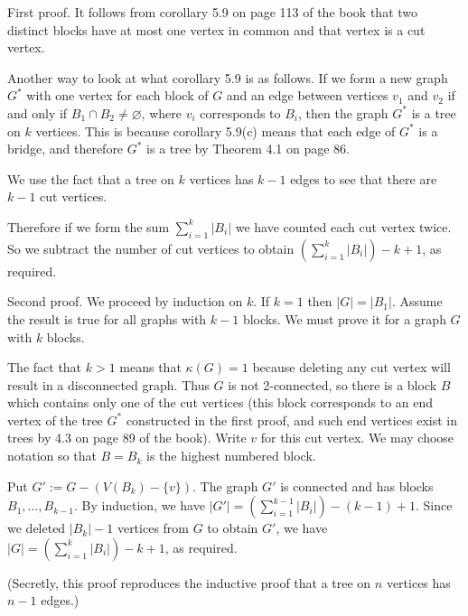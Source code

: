 \documentclass[10pt,reqno]{amsart}
\begin{document}
\begin{outline}[enumerate]
First proof. It follows from corollary 5.9 on page 113 of the book that two
distinct blocks have at most one vertex in common and that vertex is a cut
vertex.

Another way to look at what corollary 5.9 is as follows. If we form a new graph
$G^*$ with one vertex for each block of $G$ and an edge between vertices $v_1$
and $v_2$ if and only if $B_1\cap B_2\neq\varnothing$, where $v_i$ corresponds
to $B_i$, then the graph $G^*$ is a tree on $k$ vertices. This is because
corollary 5.9(c) means that each edge of $G^*$ is a bridge, and therefore $G^*$
is a tree by Theorem 4.1 on page 86.

We use the fact that a tree on $k$ vertices has $k-1$ edges to see that there
are $k-1$ cut vertices.

Therefore if we form the sum \(\sum_{i=1}^k |B_i| \) we have counted each cut
vertex twice. So we subtract the number of cut vertices to obtain \( (
\sum_{i=1}^k |B_i| )- k + 1\), as required.

Second proof. We proceed by induction on $k$. If $k=1$ then $|G| = |B_1|$.
Assume the result is true for all graphs with $k-1$ blocks. We must prove it
for a graph $G$ with $k$ blocks.

The fact that $k > 1$ means that $\kappa(G) = 1$ because deleting any cut
vertex will result in a disconnected graph. Thus $G$ is not 2-connected, so
there is a block $B$ which contains only one of the cut vertices (this block
corresponds to an end vertex of the tree $G^*$ constructed in the first proof,
and such end vertices exist in trees by 4.3 on page 89 of the book). Write $v$
for this cut vertex. We may choose notation so that $B = B_k$ is the highest
numbered block.

Put $G' := G - (V(B_k) - \{v\})$. The graph $G'$ is connected and has blocks
$B_1,\dots,B_{k-1}.$ By induction, we have $|G'| =
(\sum_{i=1}^{k-1}|B_i|)-(k-1)+1.$ Since we deleted $|B_k|-1$ vertices from $G$
to obtain $G'$, we have \( |G| = ( \sum_{i=1}^k |B_i| )- k + 1\), as required.

(Secretly, this proof reproduces the inductive proof that a tree on $n$
vertices has $n-1$ edges.)

\end{outline}
\end{document}
